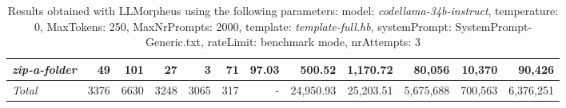 \begin{table*}
{\begin{tabular}{l||r|r|r|r|r|r||r|r||r|r|r}
   \hline
   \textit{zip-a-folder} & 49 & 101 & 27 & 3 & 71 & 97.03 & 500.52 & 1,170.72 & 80,056 & 10,370 & 90,426 \\ 
   \hline
   \textit{Total} & 3376 & 6630 & 3248 & 3065 & 317 & - & 24,950.93  & 25,203.51 & 5,675,688 & 700,563 & 6,376,251 \\ 
 \end{tabular}
 }
 \caption{Results obtained with LLMorpheus using the following parameters: 
   model: \textit{codellama-34b-instruct}, 
   temperature: 0, 
   MaxTokens: 250, 
   MaxNrPrompts: 2000, 
   template: \textit{template-full.hb}, 
   systemPrompt: SystemPrompt-Generic.txt, 
   rateLimit: benchmark mode, 
   nrAttempts: 3  
 }
\end{table*}

